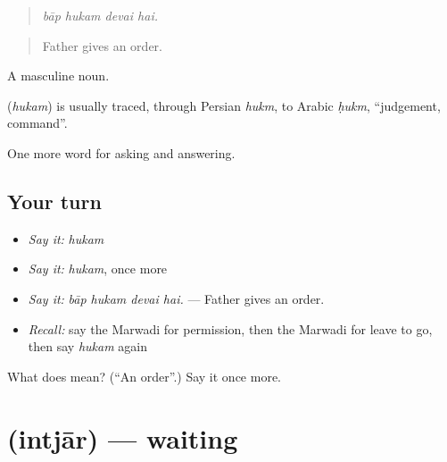 \begin{quote}
   
\end{quote}

\begin{quote}
\emph{bāp hukam devai hai.}
\end{quote}

\begin{quote}
Father gives an order.
\end{quote}

A masculine noun.

\begin{cousinweb}
\textbf{} (\emph{hukam}) is usually traced, through Persian \emph{hukm}, to Arabic \emph{ḥukm}, \textquotedblleft{}judgement, command\textquotedblright{}.
\end{cousinweb}

\begin{grammarlens}[title={What you've built}]
One more word for asking and answering.
\end{grammarlens}

\subsection*{Your turn}
\begin{itemize}
\raggedright
  \item \emph{Say it:} \emph{hukam}
  \item \emph{Say it:} \emph{hukam}, once more
  \item \emph{Say it:} \emph{bāp hukam devai hai.} — Father gives an order.
  \item \emph{Recall:} say the Marwadi for permission, then the Marwadi for leave to go, then say \emph{hukam} again
\end{itemize}

\begin{tcolorbox}[breakable,colback=teal!4,colframe=teal!35!black,title={Before you move on}]
What does  mean? (\textquotedblleft{}An order\textquotedblright{}.) Say it once more.
\end{tcolorbox}
\section[\texorpdfstring{\mw{इंतजार} (intjār)}{इंतजार (intjār)}]{ (intjār) — waiting}

\label{lesson:MW-C267-intjar}



